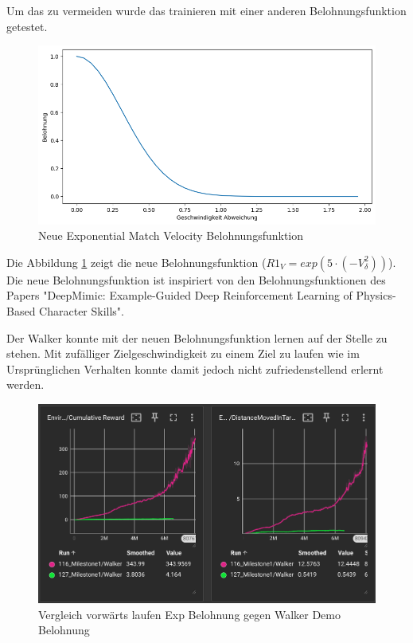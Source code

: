 Um das zu vermeiden wurde das trainieren mit einer anderen Belohnungsfunktion getestet.
\begin{figure}[H]
  \centering  
  \includegraphics[scale=0.5]{img/match_velocity_exp.png}
  \caption{Neue Exponential Match Velocity Belohnungsfunktion}
  \label{fig:match_velocity_exp}
\end{figure}
Die Abbildung \ref{fig:match_velocity_exp} zeigt die neue Belohnungsfunktion ($R1_V=exp(5 \cdot (-V_\delta^2))$). Die neue Belohnungsfunktion ist inspiriert von den Belohnungsfunktionen des Papers "DeepMimic: Example-Guided Deep Reinforcement Learning of Physics-Based Character Skills".\cite{peng2018deepmimic}

Der Walker konnte mit der neuen Belohnungsfunktion lernen auf der Stelle zu stehen. Mit zufälliger Zielgeschwindigkeit zu einem Ziel zu laufen wie im Ursprünglichen Verhalten konnte damit jedoch nicht zufriedenstellend erlernt werden.

\begin{figure}[H]
  \centering  
  \includegraphics[scale=0.5]{img/training_exp_belohnung.png}
  \caption{Vergleich vorwärts laufen Exp Belohnung gegen Walker Demo Belohnung}
  \label{fig:training_exp_belohnung}
\end{figure}


